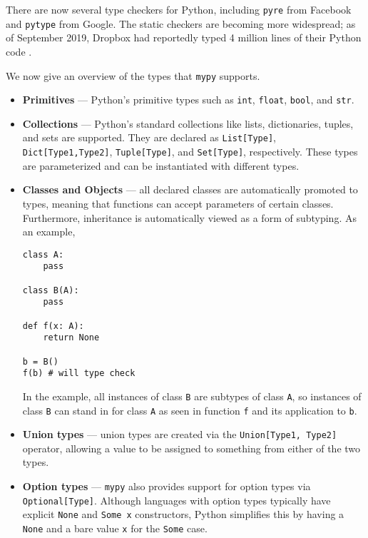 \documentclass[12pt]{report}
\begin{document}
There are now several type checkers for Python, including \texttt{pyre} from Facebook and \texttt{pytype} from Google. The static checkers are becoming more widespread; as of September 2019, Dropbox had reportedly typed 4 million lines of their Python code \cite{PythonDropbox}.

We now give an overview of the types that \texttt{mypy} supports.
\begin{itemize}
    \item \textbf{Primitives} --- Python's primitive types such as \texttt{int}, \texttt{float}, \texttt{bool}, and \texttt{str}.

    \item \textbf{Collections} --- Python's standard collections like lists, dictionaries, tuples, and sets are supported. They are declared as \texttt{List[Type]}, \texttt{Dict[Type1,Type2]}, \texttt{Tuple[Type]}, and \texttt{Set[Type]}, respectively. These types are parameterized and can be instantiated with different types.

    \item \textbf{Classes and Objects} --- all declared classes are automatically promoted to types, meaning that functions can accept parameters of certain classes. Furthermore, inheritance is automatically viewed as a form of subtyping. As an example,

    \begin{singlespace*}
    \begin{verbatim}
class A:
    pass

class B(A):
    pass

def f(x: A):
    return None

b = B()
f(b) # will type check\end{verbatim}
    \end{singlespace*}
    In the example, all instances of class \texttt{B} are subtypes of class \texttt{A}, so instances of class \texttt{B} can stand in for class \texttt{A} as seen in function \texttt{f} and its application to \texttt{b}.

    \item \textbf{Union types} --- union types are created via the \texttt{Union[Type1, Type2]} operator, allowing a value to be assigned to something from either of the two types.

    \item \textbf{Option types} --- \texttt{mypy} also provides support for option types via \texttt{Optional[Type]}. Although languages with option types typically have explicit \texttt{None} and \texttt{Some x} constructors, Python simplifies this by having a \texttt{None} and a bare value \texttt{x} for the \texttt{Some} case.


\end{itemize}
\end{document}
